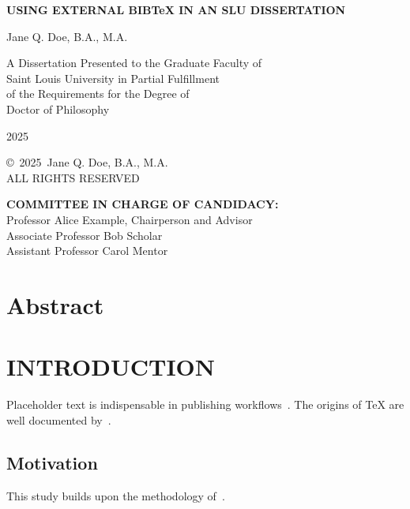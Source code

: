 \documentclass[12pt,oneside]{book}
\newcommand{\thesistitle}{USING EXTERNAL BIB\TeX{} IN AN SLU DISSERTATION}
\newcommand{\authorname}{Jane Q. Doe, B.A., M.A.}
\newcommand{\degree}{Doctor of Philosophy}
\newcommand{\graduationyear}{2025}
\newcommand{\committeelist}{%
Professor Alice Example, Chairperson and Advisor\\[1em]
Associate Professor Bob Scholar\\[1em]
Assistant Professor Carol Mentor}
\begin{document}
\begin{titlepage}\begin{center}\doublespacing
{\Large\bfseries \thesistitle\par}\vfill
\authorname\par\vfill
A Dissertation Presented to the Graduate Faculty of\\
Saint Louis University in Partial Fulfillment\\
of the Requirements for the Degree of\\[1em]
\degree\par\vfill
\graduationyear
\end{center}\end{titlepage}

\clearpage
{}\setcounter{page}{1}
\thispagestyle{plain}
\begin{center}
\copyright\ \graduationyear\ \authorname\\
ALL RIGHTS RESERVED
\end{center}
\clearpage

\thispagestyle{plain}
\noindent\textbf{COMMITTEE IN CHARGE OF CANDIDACY:}\\[2em]
\committeelist
\clearpage

\chapter*{Abstract}
\singlespacing
\lipsum[1]
\doublespacing\clearpage

\tableofcontents\clearpage
\listoftables\clearpage
\listoffigures\clearpage

\mainmatter

\chapter{INTRODUCTION}
Placeholder text is indispensable in publishing workflows~\cite{ipsum2020}.
The origins of \TeX{} are well documented by~\citet{knuth1986}.

\section{Motivation}
This study builds upon the methodology of~\cite{doe2024}.
\end{document}

